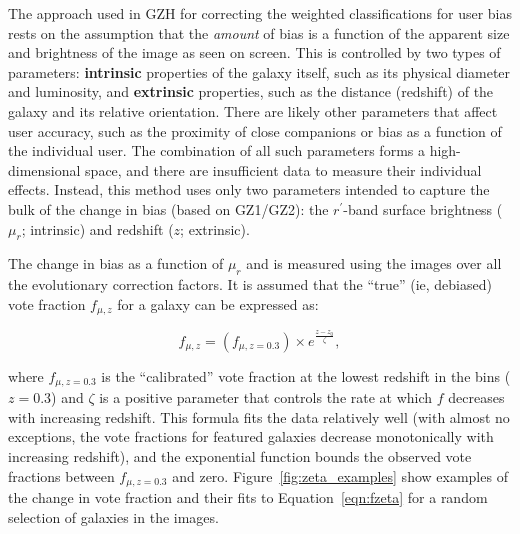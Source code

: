 \documentclass[twocolumn]{aastex6}
\begin{document}
The approach used in GZH for correcting the weighted classifications for user bias rests on the assumption that the \emph{amount} of bias is a function of the apparent size and brightness of the image as seen on screen. This is controlled by two types of parameters: \textbf{intrinsic} properties of the galaxy itself, such as its physical diameter and luminosity, and \textbf{extrinsic} properties, such as the distance (redshift) of the galaxy and its relative orientation. There are likely other parameters that affect user accuracy, such as the proximity of close companions \citep[``distraction bias''; see][]{joh15} or bias as a function of the individual user. The combination of all such parameters forms a high-dimensional space, and there are insufficient data to measure their individual effects. Instead, this method uses only two parameters intended to capture the bulk of the change in bias (based on GZ1/GZ2): the $r^\prime$-band surface brightness ($\mu_r$; intrinsic) and redshift ($z$; extrinsic). 

The change in bias as a function of $\mu_r$ and \zsim{} is measured using the \ferengi{} images over all the evolutionary correction factors. It is assumed that the ``true'' (ie, debiased) vote fraction $f_{\mu,z}$ for a galaxy can be expressed as:

\begin{equation}
f_{\mu,z} = \left(f_{\mu,z=0.3}\right) \times e^{{\frac{z-z_0}{\zeta}}},
\label{eqn:fzeta}
\end{equation}

\noindent where $f_{\mu,z=0.3}$ is the ``calibrated'' vote fraction at the lowest redshift in the \ferengi{} bins ($z=0.3$) and $\zeta$ is a positive parameter that controls the rate at which $f$ decreases with increasing redshift. This formula fits the data relatively well (with almost no exceptions, the vote fractions for featured galaxies decrease monotonically with increasing redshift), and the exponential function bounds the observed vote fractions between $f_{\mu,z=0.3}$ and zero. Figure~\ref{fig:zeta_examples} show examples of the change in vote fraction and their fits to Equation~\ref{eqn:fzeta} for a random selection of galaxies in the \ferengi{} images. 
\end{document}
